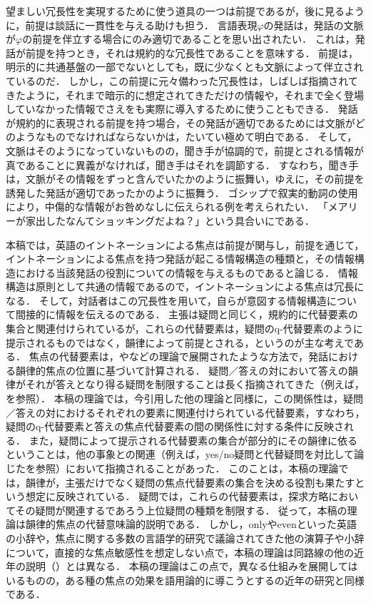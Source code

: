 \documentclass{goken}
\newcommand{\ori}[1]{\noindent\textcolor[gray]{0.7}{\fontsize{8pt}{8pt}\selectfont{\textsf{(p.~#1)}}} }
\begin{document}
望ましい冗長性を実現するために使う道具の一つは前提であるが，後に見るように，前提は談話に一貫性を与える助けも担う．
言語表現$\varphi$の発話は，発話の文脈が$\varphi$の前提を伴立する場合にのみ適切であることを思い出されたい．
これは，発話が前提を持つとき，それは規約的な冗長性であることを意味する．
前提は，明示的に共通基盤の一部でないとしても，既に少なくとも文脈によって伴立されているのだ．
しかし，この前提に元々備わった冗長性は，しばしば指摘されてきたように，それまで暗示的に想定されてきただけの情報や，それまで全く登場していなかった情報でさえをも実際に導入するために使うこともできる．
発話が規約的に表現される前提を持つ場合，その発話が適切であるためには文脈がどのようなものでなければならないかは，たいてい極めて明白である．
そして，文脈はそのようになっていないものの，聞き手が協調的で，前提とされる情報が真であることに異義がなければ，聞き手はそれを調節する．
すなわち，聞き手は，文脈がその情報をずっと含んでいたかのように振舞い，ゆえに，その前提を誘発した発話が適切であったかのように振舞う．
ゴシップで叙実的動詞の使用により，中傷的な情報がお咎めなしに伝えられる例を考えられたい．
「メアリーが家出したなんてショッキングだよね？」という具合いにである．

本稿では，英語のイントネーションによる焦点は前提が関与し，前提を通じて，イントネーションによる焦点を持つ発話が起こる情報構造の種類と，その情報構造における当該発話の役割についての情報を与えるものであると論じる．
情報構造は原則として共通の情報であるので，イントネーションによる焦点は冗長になる．
そして，対話者はこの冗長性を用いて，自らが意図する情報構造について間接的に情報を伝えるのである．
主張は疑問と同じく，規約的に代替要素の集合と関連付けられているが，これらの代替要素は，疑問のq-代替要素のように提示されるものではなく，韻律によって前提とされる，というのが主な考えである．
焦点の代替要素は，\citet{Rooth1992a}や\citet{vonStechow1991}などの理論で展開されたような方法で，発話における韻律的焦点の位置に基づいて計算される．
疑問／答えの対において答えの韻律がそれが答えとなり得る疑問を制限することは長く指摘されてきた（例えば，\citealt{Jackendoff1972}を参照）．
本稿の理論では，今引用した他の理論と同様に，この関係性は，疑問／答えの対におけるそれぞれの要素に関連付けられている代替要素，すなわち，疑問のq-代替要素と答えの焦点代替要素の間の関係性に対する条件に反映される．
\ori{28}
また，疑問によって提示される代替要素の集合が部分的にその韻律に依るということは，他の事象との関連（例えば，yes/no疑問と代替疑問を対比して論じた\citealt{vonStechow1991}を参照）において指摘されることがあった．
このことは，本稿の理論では，韻律が，主張だけでなく疑問の焦点代替要素の集合を決める役割も果たすという想定に反映されている．
疑問では，これらの代替要素は，探求方略においてその疑問が関連するであろう上位疑問の種類を制限する．
従って，本稿の理論は韻律的焦点の代替意味論的説明である．
しかし，onlyやevenといった英語の小辞や，焦点に関する多数の言語学的研究で議論されてきた他の演算子や小辞について，直接的な焦点敏感性を想定しない点で，本稿の理論は同路線の他の近年の説明（\citealt{Rooth1985,vonStechow1991,Krifka1992}）とは異なる．
本稿の理論はこの点で，異なる仕組みを展開してはいるものの，ある種の焦点の効果を語用論的に導こうとする\citet{Rooth1992a,Schwarzschild1994a,Schwarzschild1994b,vonFintel2004}の近年の研究と同様である．
\end{document}
